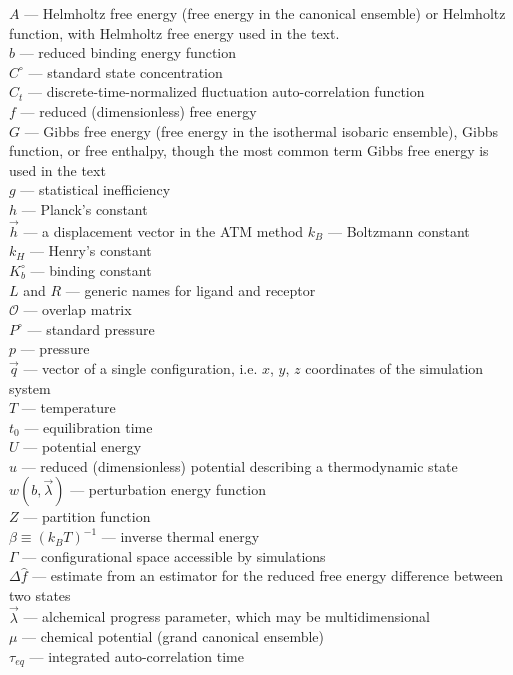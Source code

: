 \documentclass[9pt,bestpractices]{livecoms}
\begin{document}
\begin{tcolorbox}[title=List of Symbols, colback=green!10!white]
$A$ --- Helmholtz free energy (free energy in the canonical ensemble) or Helmholtz function, with Helmholtz free energy used in the text.\\
$b$ --- reduced binding energy function \\
$C^{\circ}$ --- standard state concentration \\
$C_t$ --- discrete-time-normalized fluctuation auto-correlation function\\
$f$ --- reduced (dimensionless) free energy \\
$G$ --- Gibbs free energy (free energy in the isothermal isobaric ensemble), Gibbs function, or free enthalpy, though the most common term Gibbs free energy is used in the text\\
$g$ --- statistical inefficiency\\
$h$ --- Planck's constant \\
$\vec{h}$ --- a displacement vector in the ATM method
$k_B$ --- Boltzmann constant \\
$k_H$ --- Henry's constant \\
$K_b^{\circ}$ --- binding  constant \\
$L$ and $R$ --- generic names for ligand and receptor\\
$\mathcal{O}$ --- overlap matrix\\
$P^{\circ}$ --- standard pressure \\
$p$ --- pressure \\
$\vec{q}$ --- vector of a single configuration, i.e. $x$, $y$, $z$ coordinates of the simulation system\\
$T$ --- temperature \\
$t_0$ --- equilibration time \\
$U$ --- potential energy\\
$u$ --- reduced (dimensionless) potential describing a thermodynamic state \\
$w(b, \vec{\lambda})$ --- perturbation energy function \\
$Z$ --- partition function \\
$\beta \equiv (k_B T)^{-1}$ --- inverse thermal energy \\
$\Gamma$ --- configurational space accessible by simulations \\
$\Delta \hat{f}$ --- estimate from an estimator for the reduced free energy difference between two states\\
$\vec{\lambda}$ --- alchemical progress parameter, which may be multidimensional \\
$\mu$ --- chemical potential (grand canonical ensemble)\\
$\tau _{eq}$ --- integrated auto-correlation time\\
\end{tcolorbox}
\end{document}
